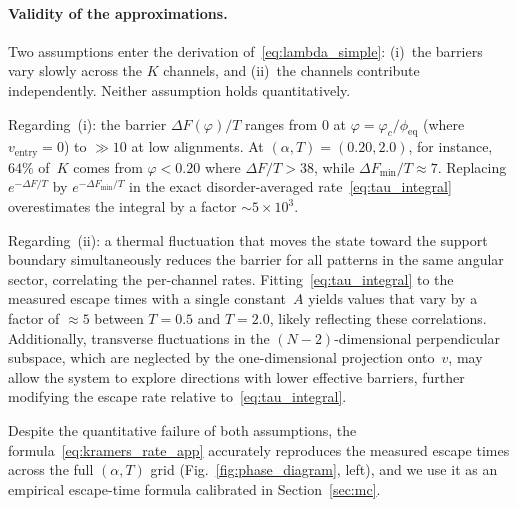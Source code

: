 \documentclass[11pt]{article}
\begin{document}
\paragraph{Validity of the approximations.}
Two assumptions enter the derivation of~\eqref{eq:lambda_simple}: (i)~the barriers vary slowly across the $K$ channels, and (ii)~the channels contribute independently.  Neither assumption holds quantitatively.

Regarding~(i): the barrier $\Delta F(\varphi)/T$ ranges from $0$ at $\varphi = \varphi_c/\phi_{\mathrm{eq}}$ (where $v_{\mathrm{entry}} = 0$) to $\gg 10$ at low alignments.  At $(\alpha, T) = (0.20, 2.0)$, for instance, $64\%$ of~$K$ comes from $\varphi < 0.20$ where $\Delta F/T > 38$, while $\Delta F_{\min}/T \approx 7$.  Replacing $e^{-\Delta F/T}$ by $e^{-\Delta F_{\min}/T}$ in the exact disorder-averaged rate~\eqref{eq:tau_integral} overestimates the integral by a factor $\sim\! 5 \times 10^3$.

Regarding~(ii): a thermal fluctuation that moves the state toward the support boundary simultaneously reduces the barrier for all patterns in the same angular sector, correlating the per-channel rates.  Fitting~\eqref{eq:tau_integral} to the measured escape times with a single constant~$A$ yields values that vary by a factor of $\approx 5$ between $T = 0.5$ and $T = 2.0$, likely reflecting these correlations.  Additionally, transverse fluctuations in the $(N{-}2)$-dimensional perpendicular subspace, which are neglected by the one-dimensional projection onto~$v$, may allow the system to explore directions with lower effective barriers, further modifying the escape rate relative to~\eqref{eq:tau_integral}.

Despite the quantitative failure of both assumptions, the formula~\eqref{eq:kramers_rate_app} accurately reproduces the measured escape times across the full $(\alpha, T)$ grid (Fig.~\ref{fig:phase_diagram}, left), and we use it as an empirical escape-time formula calibrated in Section~\ref{sec:mc}.
\end{document}
